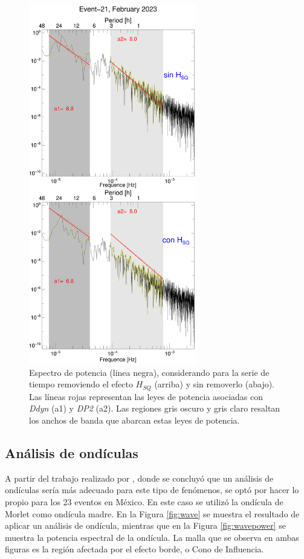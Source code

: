 \begin{figure}
    \centering
     \includegraphics[width=0.65\textwidth]{Images/cap3/powerlaw/diono_PWS_powerL_2023-02-25.eps}
      \caption{Espectro de potencia (linea negra), considerando para la serie de tiempo removiendo el efecto $H_{SQ}$ (arriba) y sin removerlo (abajo). Las líneas rojas representan las leyes de potencia asociadas con \emph{Ddyn} (a1) y \emph{DP2} (a2). Las regiones gris oscuro y gris claro resaltan los anchos de banda que abarcan estas leyes de potencia.}
       \label{fig:powerlaw}
\end{figure}


\subsection{Análisis de ondículas}

A partir del trabajo realizado por \cite{2021amory}, donde se concluyó que un análisis de ondículas sería más adecuado para este tipo de fenómenos, se optó por hacer lo propio para los 23 eventos en México. En este caso se utilizó la ondícula de Morlet como ondícula madre. En la Figura \ref{fig:wave} se muestra el resultado de aplicar un análisis de ondícula, mientras que en la Figura \ref{fig:wavepower} se muestra la potencia espectral de la ondícula. La malla que se observa en ambas figuras es la región afectada por el efecto borde, o Cono de Influencia. 
\vspace{1 em}


